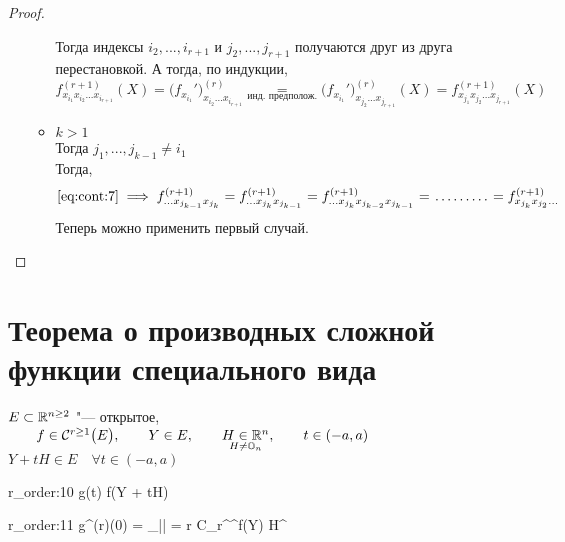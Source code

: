 \begin{proof}
\begin{itemize}
\begin{itemize}
			Тогда индексы $ i_2, ..., i_{r + 1} $ и $ j_2, ..., j_{r + 1} $ получаются друг из друга перестановкой. А тогда, по индукции,
			$$ f_{x_{i_1}x_{i_2}...x_{i_{r + 1}}}^{(r + 1)}(X) = \bigg( f_{x_{i_1}}' \bigg)_{x_{i_2}...x_{i_{r + 1}}}^{(r)} \underset{\text{инд. предполож.}}= \bigg( f_{x_{i_1}}' \bigg)^{(r)}_{x_{j_2}...x_{j_{r + 1}}}(X) = f_{x_{j_1}x_{j_2}...x_{j_{r + 1}}}^{(r + 1)}(X) $$
			\item $ k > 1 $ \\
			Тогда $ j_1, ..., j_{k - 1} \ne i_1 $ \\
			Тогда,
			$$ \eref{cont:7} \implies f_{...x_{j_{k - 1}}x_{j_k}}^{(r + 1)} = f_{...x_{j_k}x_{j_{k - 1}}}^{(r + 1)} = f_{...x_{j_k}x_{j_{k - 2}}x_{j_{k - 1}}}^{(r + 1)} = \widedots[4em] = f_{x_{j_k}x_{j_2}...}^{(r + 1)} $$
			Теперь можно применить первый случай.
		\end{itemize}
	\end{itemize}
\end{proof}

\section{Теорема о производных сложной функции специального вида}
\begin{theorem}
	$ E \sub \R^{n \ge 2} $ "--- открытое, $ \qquad f \in \Cont[r \ge 1]{E}, \qquad Y \in E, \qquad \underset{H \ne \On}{H \in \R^n}, \qquad t \in (-a, a) $ \\
	$ Y + tH \in E \quad \forall t \in (-a, a) $
	\begin{equ}{r_order:10}
		g(t)  f(Y + tH)
	\end{equ}
	\begin{equ}{r_order:11}
		\implies g^{(r)}(0) = \sum_{|\alpha| = r} C_r^\alpha \partial^\alpha f(Y) H^\alpha
	\end{equ}
\end{theorem}

